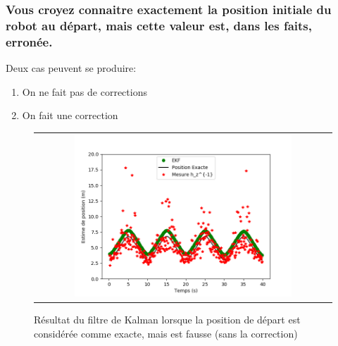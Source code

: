 \documentclass[12pt]{article}
\begin{document}
\subsubsection{Vous croyez connaitre exactement la position initiale du robot au départ, mais cette valeur est, dans les faits, erronée.}

Deux cas peuvent se produire:
\begin{enumerate}
    \item On ne fait pas de corrections
    \item On fait une correction
\end{enumerate}

\begin{figure}[ht]
 \begin{center}
  \begin{tabular}{c}
    \includegraphics[width=0.75\textwidth]{fig/kalman-position-err-certitude-pas-correction.png}
  \end{tabular}
 \end{center}
\vspace{-0.25in}
    \caption{Résultat du filtre de Kalman lorsque la position de départ est considérée comme exacte, mais est fausse (sans la correction)}
    \label{kalman-position-err-certitude-pas-correction}
\end{figure}
\end{document}
